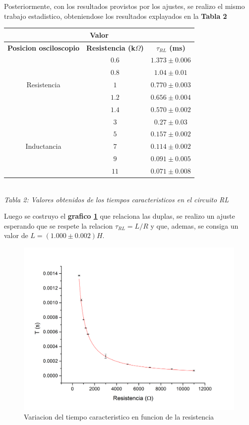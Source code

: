 \documentclass[11pt,a4paper]{article}
\begin{document}
Posteriormente, con los resultados provistos por los ajustes, se realizo el mismo trabajo estadistico, obteniendose los resultados explayados en la \textbf{Tabla 2}

\begin{center}
\begin{tabular}{||c|c|c||}
\hline
\multicolumn{3}{||c||}{\textbf{Valor}} \\ \hline
\textbf{Posicion osciloscopio} & \textbf{Resistencia (k$\Omega$)} & \textbf{$\tau_{RL}$ (ms)}\\ \hline 
\multirow {5}{2cm}{Resistencia} & $0.6$ & $1.373 \pm 0.006$ \\ \cline {2-3}
& $0.8$ & $1.04\pm 0.01$ \\ \cline {2-3} 
& $1$ & $0.770 \pm 0.003$ \\ \cline {2-3}
& $1.2$ & $0.656 \pm 0.004$ \\ \cline {2-3}
& $1.4$ & $0.570 \pm 0.002$ \\ \hline
\multirow {5}{2cm}{Inductancia} & $3$ & $0.27 \pm 0.03$ \\ \cline {2-3}
& $5$ & $0.157 \pm 0.002$ \\ \cline {2-3}
& $7$ & $0.114 \pm 0.002$ \\ \cline {2-3}
& $9$ & $0.091 \pm 0.005$ \\ \cline {2-3} 
& $11$ & $0.071 \pm 0.008$ \\ \hline
\end{tabular}\\[0.3cm]

 \textit{Tabla 2: Valores obtenidos de los tiempos caracteristicos en el circuito RL}
\end{center}

Luego se costruyo el \textbf{grafico \ref{fig:T-RL}} que relaciona las duplas, se realizo un ajuste esperando que se respete la relacion $\tau_{RL} = L/R$ y que, ademas, se consiga un valor de $L = (1.000 \pm 0.002) H$.

\begin{figure}[H]
\centering
\includegraphics[scale=0.45]{TauRCvsR_Todo_en_Serie}
  \caption{Variacion del tiempo caracteristico en funcion de la resistencia}
  \label{fig:T-RL}
\end{figure}
\end{document}

